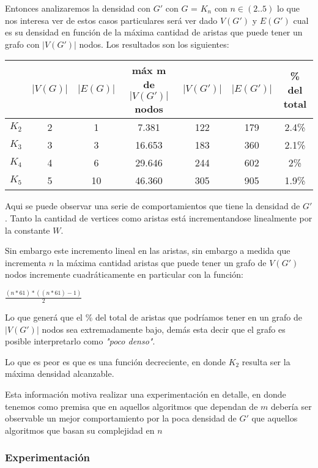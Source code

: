 \documentclass[12pt]{article}
\begin{document}
Entonces analizaremos la densidad con $G'$ con $G$ = $K_n$ con $n \in (2..5)$ lo que nos interesa ver de estos casos particulares será ver dado $V(G')$ y $E(G')$ cual es su densidad en función de la máxima cantidad de aristas que puede tener un grafo con $|V(G')|$ nodos. Los resultados son los siguientes:

\begin{center}
	\begin{tabular}{| c |c | c || c | c | c | c |} 
		\hline
		& $|V(G)|$ & $|E(G)|$ & máx m de $|V(G')|$ nodos & $|V(G')|$ & $|E(G')|$ & \% del total \\ [0.5ex] 
		\hline\hline
		$K_2$ & 2 & 1 & 7.381 & 122 & 179 & 2.4\% \\ 
		\hline
		$K_3$ & 3 & 3 & 16.653 & 183 & 360 & 2.1\% \\
		\hline
		$K_4$ & 4 & 6 & 29.646 & 244 & 602 & 2\% \\
		\hline
		$K_5$ & 5 & 10 & 46.360 & 305 & 905 & 1.9\% \\
		\hline
	\end{tabular}
\end{center}

Aqui se puede observar una serie de comportamientos que tiene la densidad de $G'$. Tanto la cantidad de vertices como aristas está incrementandose linealmente por la constante $W$. 

Sin embargo este incremento lineal en las aristas, sin embargo a medida que incrementa $n$ la máxima cantidad aristas que puede tener un grafo de $V(G')$ nodos incremente cuadráticamente en particular con la función:

\begin{center}
$\frac{(n * 61) *((n * 61) - 1)}{2}$
\end{center}

Lo que generá que el \% del total de aristas que podríamos tener en un grafo de $|V(G')|$ nodos sea extremadamente bajo, demás esta decir que el grafo es posible interpretarlo como \textit{"poco denso"}.

Lo que es peor es que es una función decreciente, en donde $K_2$ resulta ser la máxima densidad alcanzable.

Esta información motiva realizar una experimentación en detalle, en donde tenemos como premisa que en aquellos algoritmos que dependan de $m$ debería ser observable un mejor comportamiento por la poca densidad de $G'$ que aquellos algoritmos que basan su complejidad en $n$


\subsubsection{Experimentación}
\end{document}

